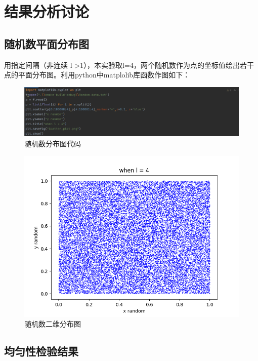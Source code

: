 \documentclass{article}
\begin{document}
            \section{结果分析讨论}
                \subsection{随机数平面分布图}
                用指定间隔（非连续 l >1），本实验取l=4，两个随机数作为点的坐标值绘出若干点的平面分布图。利用python中matplolib库函数作图如下：
                \begin{figure}[H]
                    \centering
                    \includegraphics[width= .8\textwidth]{picture/333.png}
                    \caption{随机数分布图代码}
                \end{figure}
                \begin{figure}[H]
                    \centering
                    \includegraphics[width= .8\textwidth]{picture/Scatter_plot.png}
                    \caption{随机数二维分布图}
                \end{figure}
                \newpage
                \subsection{均匀性检验结果}
                
\end{document}
